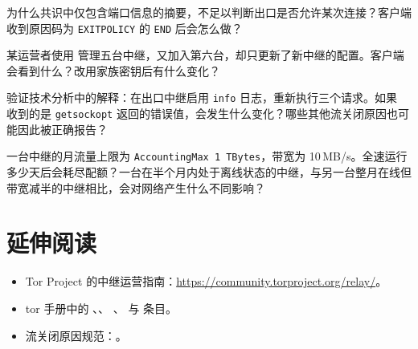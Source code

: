 \begin{esercizio}[1]\label{es:22-riassunto}
为什么共识中仅包含端口信息的摘要，不足以判断出口是否允许某次连接？客户端收到原因码为 \texttt{EXITPOLICY} 的 \texttt{END} 后会怎么做？
\end{esercizio}

\begin{esercizio}[2]\label{es:22-famiglia}
某运营者使用  管理五台中继，又加入第六台，却只更新了新中继的配置。客户端会看到什么？改用家族密钥后有什么变化？
\end{esercizio}

\begin{esercizio}[2]\label{es:22-refused}
验证技术分析中的解释：在出口中继启用 \texttt{info} 日志，重新执行三个请求。如果  收到的是 \texttt{getsockopt} 返回的错误值，会发生什么变化？哪些其他流关闭原因也可能因此被正确报告？
\end{esercizio}

\begin{esercizio}[3]\label{es:22-accounting}
一台中继的月流量上限为 \texttt{AccountingMax 1 TBytes}，带宽为 10\,MB/s。全速运行多少天后会耗尽配额？一台在半个月内处于离线状态的中继，与另一台整月在线但带宽减半的中继相比，会对网络产生什么不同影响？
\end{esercizio}

\section*{延伸阅读}
\begin{itemize}
  \item Tor Project 的中继运营指南：\url{https://community.torproject.org/relay/}。
  \item \begin{sloppypar}tor 手册中的 、、
        、 与  条目。\end{sloppypar}
  \item 流关闭原因规范：。
\end{itemize}
